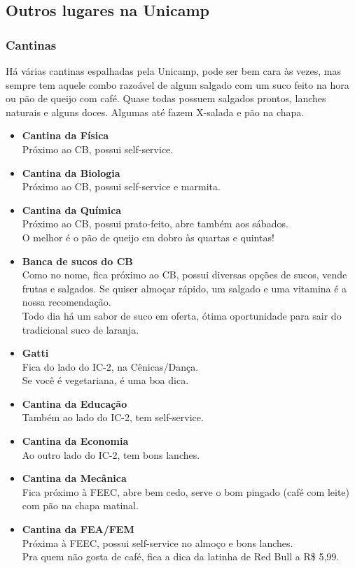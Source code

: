 
\subsection{Outros lugares na Unicamp}

\subsubsection{Cantinas}

Há várias cantinas espalhadas pela Unicamp, pode ser bem cara às vezes, mas
sempre tem aquele combo razoável de algum salgado com um suco feito na hora ou
pão de queijo com café. Quase todas possuem salgados prontos, lanches naturais
e alguns doces. Algumas até fazem X-salada e pão na chapa.

\begin{itemize}
\item \textbf{Cantina da Física}
  \\Próximo ao CB, possui self-service.
\item \textbf{Cantina da Biologia}
  \\Próximo ao CB, possui self-service e marmita.
\item \textbf{Cantina da Química}
  \\Próximo ao CB, possui prato-feito, abre também aos sábados.
  \\O melhor é o pão de queijo em dobro às quartas e quintas!
\item \textbf{Banca de sucos do CB}
  \\Como no nome, fica próximo ao CB, possui diversas opções de sucos, vende
  frutas e salgados. Se quiser almoçar rápido, um salgado e uma vitamina é a
  nossa recomendação.
  \\Todo dia há um sabor de suco em oferta, ótima oportunidade para sair do
  tradicional suco de laranja.
\item \textbf{Gatti}
  \\Fica do lado do IC-2, na Cênicas/Dança.
  \\Se você é vegetariana, é uma boa dica.
\item \textbf{Cantina da Educação}
  \\Também ao lado do IC-2, tem self-service.
\item \textbf{Cantina da Economia}
  \\Ao outro lado do IC-2, tem bons lanches.
\item \textbf{Cantina da Mecânica}
  \\Fica próximo à FEEC, abre bem cedo, serve o bom pingado (café com leite)
  com pão na chapa matinal.
\item \textbf{Cantina da FEA/FEM}
  \\Próxima à FEEC, possui self-service no almoço e bons lanches.
  \\Pra quem não gosta de café, fica a dica da latinha de Red Bull a R\$ 5,99.
\end{itemize}

